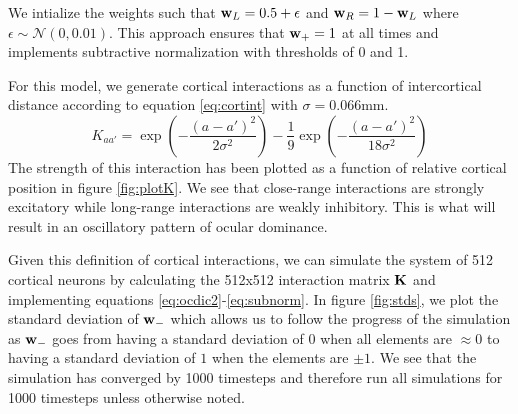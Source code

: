 \documentclass{article}
\begin{document}
We intialize the weights such that ${\bf w}_L = 0.5 + \epsilon$ and ${\bf w}_R = 1 - {\bf w}_L$ where $\epsilon \sim \mathcal{N}(0, 0.01)$. This approach ensures that ${\bf w}_+ = 1$ at all times and implements subtractive normalization with thresholds of 0 and 1. %

For this model, we generate cortical interactions as a function of intercortical distance according to equation \ref{eq:cortint} with $\sigma = 0.066$mm.
\begin{equation}\label{eq:cortint}
K_{aa'} = \exp{(-\dfrac{(a-a')^2}{2\sigma^2})} - \dfrac{1}{9}\exp{(-\dfrac{(a-a')^2}{18\sigma^2})}
\end{equation}
The strength of this interaction has been plotted as a function of relative cortical position in figure \ref{fig:plotK}. We see that close-range interactions are strongly excitatory while long-range interactions are weakly inhibitory. This is what will result  in an oscillatory pattern of ocular dominance.

Given this definition of cortical interactions, we can simulate the system of 512 cortical neurons by calculating the 512x512 interaction matrix $\bf K$ and implementing equations \ref{eq:ocdic2}-\ref{eq:subnorm}. In figure \ref{fig:stds}, we plot the standard deviation of ${\bf w}_-$ which allows us to follow the progress of the simulation as ${\bf w}_-$ goes from having a standard deviation of $0$ when all elements are $\approx 0$ to having a standard deviation of $1$ when the elements are $\pm 1$. We see that the simulation has converged by 1000 timesteps and therefore run all simulations for 1000 timesteps unless otherwise noted.
\end{document}
